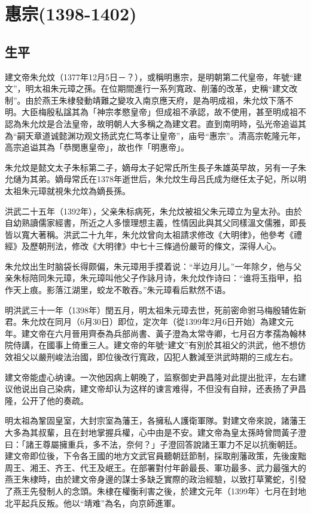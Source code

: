 
\section{惠宗\tiny(1398-1402)}

\subsection{生平}

建文帝朱允炆（1377年12月5日－？），或稱明惠宗，是明朝第二代皇帝，年號“建文”，明太祖朱元璋之孫。在位期間進行一系列寬政、削藩的改革，史稱“建文改制”。由於燕王朱棣發動靖難之變攻入南京應天府，是為明成祖，朱允炆下落不明。大臣梅殷私諡其為「神宗孝愍皇帝」但成祖不承認，故不使用，甚至明成祖不認為朱允炆是合法皇帝，故明朝人大多稱之為建文君。直到南明時，弘光帝追谥其為“嗣天章道诚懿渊功观文扬武克仁笃孝让皇帝”，庙号“惠宗”。清高宗乾隆元年，高宗追谥其為「恭閔惠皇帝」，故也作「明惠帝」。

朱允炆是懿文太子朱标第二子，嫡母太子妃常氏所生長子朱雄英早故，另有一子朱允熥为其弟。嫡母常氏在1378年逝世后，朱允炆生母吕氏成为继任太子妃，所以明太祖朱元璋就視朱允炆為嫡長孫。

洪武二十五年（1392年），父亲朱标病死，朱允炆被祖父朱元璋立为皇太孙。由於自幼熟讀儒家經書，所近之人多懷理想主義，性情因此與其父同樣溫文儒雅，即長皆以寬大著稱。洪武二十九年，朱允炆曾向太祖請求修改《大明律》，他參考《禮經》及歷朝刑法，修改《大明律》中七十三條過份嚴苛的條文，深得人心。

朱允炆出生时脑袋长得颇偏，朱元璋用手摸着说：“半边月儿。”一年除夕，他与父亲朱标陪同朱元璋，朱元璋叫他父子作詠月诗，朱允炆作诗曰：“谁将玉指甲，掐作天上痕。影落江湖里，蛟龙不敢吞。”朱元璋看后默然不语。

明洪武三十一年（1398年）閏五月，明太祖朱元璋去世，死前密命驸马梅殷辅佐新君。朱允炆在同月（6月30日）即位，定次年（從1399年2月6日开始）為建文元年。建文帝在六月晉用齊泰為兵部尚書、黃子澄為太常寺卿，七月召方孝孺為翰林院侍講，在國事上倚重三人。建文帝的年號“建文”有別於其祖父的洪武，他不想仿效祖父以嚴刑峻法治國，即位後改行寬政，囚犯人數減至洪武時期的三成左右。

建文帝能虚心纳谏。一次他因病上朝晚了，监察御史尹昌隆对此提出批评，左右建议他说出自己染病，建文帝却认为这样的谏言难得，不但没有自辩，还表扬了尹昌隆，公开了他的奏疏。

明太祖為鞏固皇室，大封宗室為藩王，各擁私人護衛軍隊。對建文帝來說，諸藩王大多為其叔輩，且在封地掌握兵權，心中由是不安。建文帝為皇太孫時曾問黃子澄曰：「諸王尊屬擁重兵，多不法，奈何？」子澄回答說諸王軍力不足以抗衡朝廷。建文帝即位後，下令各王國的地方文武官員聽朝廷節制，採取削藩政策，先後废黜周王、湘王、齐王、代王及岷王。在部署對付年齡最長、軍功最多、武力最强大的燕王朱棣時，由於建文帝身邊的謀士多缺乏實際的政治經驗，以致打草驚蛇，引發了燕王先發制人的念頭。朱棣在權衡利害之後，於建文元年（1399年）七月在封地北平起兵反叛。他以“靖难”為名，向京師進軍。

